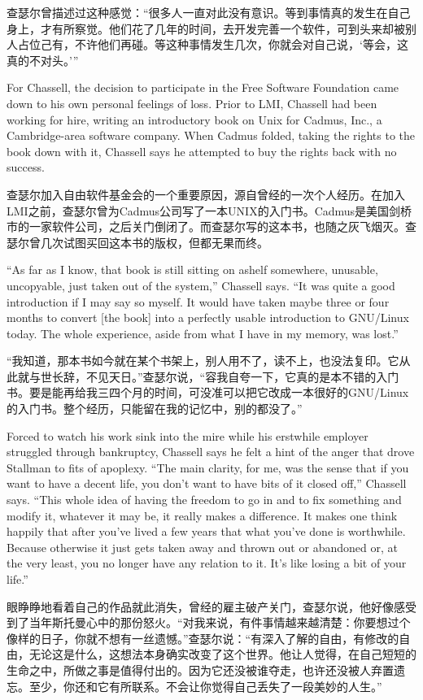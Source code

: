 \ifdefined\chs
查瑟尔曾描述过这种感觉：``很多人一直对此没有意识。等到事情真的发生在自己身上，才有所察觉。他们花了几年的时间，去开发完善一个软件，可到头来却被别人占位己有，不许他们再碰。等这种事情发生几次，你就会对自己说，`等会，这真的不对头。'\hspace{0.01in}''
\fi

\ifdefined\eng
For Chassell, the decision to participate in the Free Software Foundation came down to his own personal feelings of loss. Prior to LMI, Chassell had been working for hire, writing an introductory book on Unix for Cadmus, Inc., a Cambridge-area software company. When Cadmus folded, taking the rights to the book down with it, Chassell says he attempted to buy the rights back with no success.
\fi

\ifdefined\chs
查瑟尔加入自由软件基金会的一个重要原因，源自曾经的一次个人经历。在加入LMI之前，查瑟尔曾为Cadmus公司写了一本UNIX的入门书。Cadmus是美国剑桥市的一家软件公司，之后关门倒闭了。而查瑟尔写的这本书，也随之灰飞烟灭。查瑟尔曾几次试图买回这本书的版权，但都无果而终。
\fi

\ifdefined\eng
``As far as I know, that book is still sitting on \ifdefined\vtwo a\fi shelf somewhere, unusable, uncopyable, just taken out of the system,'' Chassell says. ``It was quite a good introduction if I may say so myself. It would have taken maybe three or four months to convert [the book] into a perfectly usable introduction to GNU/Linux today. The whole experience, aside from what I have in my memory, was lost.''
\fi

\ifdefined\chs
``我知道，那本书如今就在某个书架上，别人用不了，读不上，也没法复印。它从此就与世长辞，不见天日。''查瑟尔说，``容我自夸一下，它真的是本不错的入门书。要是能再给我三四个月的时间，可没准可以把它改成一本很好的GNU/Linux的入门书。整个经历，只能留在我的记忆中，别的都没了。''
\fi

\ifdefined\eng
Forced to watch his work sink into the mire while his erstwhile employer struggled through bankruptcy, Chassell says he felt a hint of the anger that drove Stallman to fits of apoplexy. ``The main clarity, for me, was the sense that if you want to have a decent life, you don't want to have bits of it closed off,'' Chassell says. ``This whole idea of having the freedom to go in and to fix something and modify it, whatever it may be, it really makes a difference. It makes one think happily that after you've lived a few years that what you've done is worthwhile. Because otherwise it just gets taken away and thrown out or abandoned or, at the very least, you no longer have any relation to it. It's like losing a bit of your life.''
\fi

\ifdefined\chs
眼睁睁地看着自己的作品就此消失，曾经的雇主破产关门，查瑟尔说，他好像感受到了当年斯托曼心中的那份怒火。``对我来说，有件事情越来越清楚：你要想过个像样的日子，你就不想有一丝遗憾。''查瑟尔说：``有深入了解的自由，有修改的自由，无论这是什么，这想法本身确实改变了这个世界。他让人觉得，在自己短短的生命之中，所做之事是值得付出的。因为它还没被谁夺走，也许还没被人弃置遗忘。至少，你还和它有所联系。不会让你觉得自己丢失了一段美妙的人生。''
\fi

\bigskip

\theendnotes
\setcounter{endnote}{0
}

